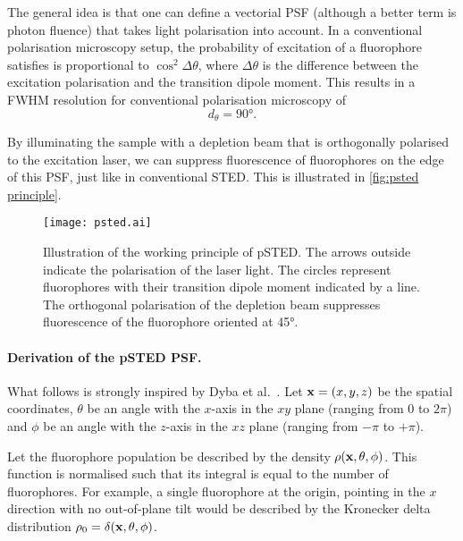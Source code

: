 The general idea is that one can define a vectorial PSF (although a better term is photon fluence) that takes light polarisation into account. In a conventional polarisation microscopy setup, the probability of excitation of a fluorophore satisfies is proportional to $ \cos^2 \Delta\theta $, where $ \Delta\theta $ is the difference between the excitation polarisation and the transition dipole moment. This results in a FWHM resolution for conventional polarisation microscopy of 
\begin{equation}
	d_\theta = \ang{90}.
\end{equation}


By illuminating the sample with a depletion beam that is orthogonally polarised to the excitation laser, we can suppress fluorescence of fluorophores on the edge of this PSF, just like in conventional STED. This is illustrated in \autoref{fig:psted principle}.

\begin{figure}
	\centering
	\texttt{[image: psted.ai]}
	\caption{
		Illustration of the working principle of pSTED. The arrows outside indicate the polarisation of the laser light. The circles represent fluorophores with their transition dipole moment indicated by a line. The orthogonal polarisation of the depletion beam suppresses fluorescence of the fluorophore oriented at \ang{45}.
	}
	\label{fig:psted principle}
\end{figure}

\paragraph{Derivation of the pSTED PSF.} What follows is strongly inspired by Dyba et al.~\cite{Dyba2005}. Let $ \vb{x} = (x, y, z)$ be the spatial coordinates, $ \theta $ be an angle with the $ x $-axis in the $ xy $ plane (ranging from $ 0 $ to $ 2\pi$) and $ \phi $ be an angle with the $ z $-axis in the $ xz $ plane (ranging from $ -\pi $ to $+\pi$). 

Let the fluorophore population be described by the density $ \rho(\vb{x}, \theta, \phi) $. This function is normalised such that its integral is equal to the number of fluorophores. For example, a single fluorophore at the origin, pointing in the $ x $ direction with no out-of-plane tilt would be described by the Kronecker delta distribution $ \rho_0 = \delta(\vb{x}, \theta, \phi) $.

